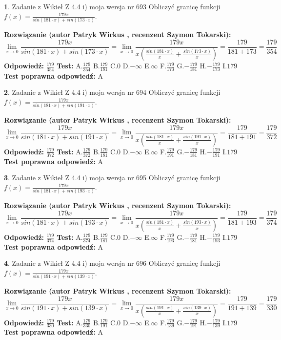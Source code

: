 \documentclass[12pt, a4paper]{article}
\theoremstyle{definition} %
\newtheorem{zad}{}
\newcommand{\zadStart}[1]{\begin{zad}#1\newline}
\newcommand{\zadStop}{\end{zad}}
\newcommand{\rozwStart}[2]{\noindent \textbf{Rozwiązanie (autor #1 , recenzent #2): }\newline}
\newcommand{\rozwStop}{\newline}
\newcommand{\odpStart}{\noindent \textbf{Odpowiedź:}\newline}
\newcommand{\odpStop}{\newline}
\newcommand{\testStart}{\noindent \textbf{Test:}\newline}
\newcommand{\testStop}{\newline}
\newcommand{\kluczStart}{\noindent \textbf{Test poprawna odpowiedź:}\newline}
\newcommand{\kluczStop}{\newline}
\begin{document}
\zadStart{Zadanie z Wikieł Z 4.4 i) moja wersja nr 693}
Obliczyć granicę funkcji $f(x)=\frac{179x}{sin(181\cdot x) +sin(173\cdot x)}$.
\zadStop
\rozwStart{Patryk Wirkus}{Szymon Tokarski}
$$\lim\limits_{x\to 0}\frac{179x}{sin(181\cdot x) +sin(173\cdot x)}=\lim\limits_{x\to 0}\frac{179x}{x(\frac{sin(181\cdot x)}{x}+\frac{sin(173\cdot x)}{x})}=\frac{179}{181+173} = \frac{179}{354}$$
\rozwStop
\odpStart
$\frac{179}{354}$
\odpStop
\testStart
A.$\frac{179}{354}$
B.$\frac{179}{181}$
C.$0$
D.$-\infty$
E.$\infty$
F.$\frac{179}{173}$
G.$-\frac{179}{181}$
H.$-\frac{179}{173}$
I.$179$
\testStop
\kluczStart
A
\kluczStop



\zadStart{Zadanie z Wikieł Z 4.4 i) moja wersja nr 694}
Obliczyć granicę funkcji $f(x)=\frac{179x}{sin(181\cdot x) +sin(191\cdot x)}$.
\zadStop
\rozwStart{Patryk Wirkus}{Szymon Tokarski}
$$\lim\limits_{x\to 0}\frac{179x}{sin(181\cdot x) +sin(191\cdot x)}=\lim\limits_{x\to 0}\frac{179x}{x(\frac{sin(181\cdot x)}{x}+\frac{sin(191\cdot x)}{x})}=\frac{179}{181+191} = \frac{179}{372}$$
\rozwStop
\odpStart
$\frac{179}{372}$
\odpStop
\testStart
A.$\frac{179}{372}$
B.$\frac{179}{181}$
C.$0$
D.$-\infty$
E.$\infty$
F.$\frac{179}{191}$
G.$-\frac{179}{181}$
H.$-\frac{179}{191}$
I.$179$
\testStop
\kluczStart
A
\kluczStop



\zadStart{Zadanie z Wikieł Z 4.4 i) moja wersja nr 695}
Obliczyć granicę funkcji $f(x)=\frac{179x}{sin(181\cdot x) +sin(193\cdot x)}$.
\zadStop
\rozwStart{Patryk Wirkus}{Szymon Tokarski}
$$\lim\limits_{x\to 0}\frac{179x}{sin(181\cdot x) +sin(193\cdot x)}=\lim\limits_{x\to 0}\frac{179x}{x(\frac{sin(181\cdot x)}{x}+\frac{sin(193\cdot x)}{x})}=\frac{179}{181+193} = \frac{179}{374}$$
\rozwStop
\odpStart
$\frac{179}{374}$
\odpStop
\testStart
A.$\frac{179}{374}$
B.$\frac{179}{181}$
C.$0$
D.$-\infty$
E.$\infty$
F.$\frac{179}{193}$
G.$-\frac{179}{181}$
H.$-\frac{179}{193}$
I.$179$
\testStop
\kluczStart
A
\kluczStop



\zadStart{Zadanie z Wikieł Z 4.4 i) moja wersja nr 696}
Obliczyć granicę funkcji $f(x)=\frac{179x}{sin(191\cdot x) +sin(139\cdot x)}$.
\zadStop
\rozwStart{Patryk Wirkus}{Szymon Tokarski}
$$\lim\limits_{x\to 0}\frac{179x}{sin(191\cdot x) +sin(139\cdot x)}=\lim\limits_{x\to 0}\frac{179x}{x(\frac{sin(191\cdot x)}{x}+\frac{sin(139\cdot x)}{x})}=\frac{179}{191+139} = \frac{179}{330}$$
\rozwStop
\odpStart
$\frac{179}{330}$
\odpStop
\testStart
A.$\frac{179}{330}$
B.$\frac{179}{191}$
C.$0$
D.$-\infty$
E.$\infty$
F.$\frac{179}{139}$
G.$-\frac{179}{191}$
H.$-\frac{179}{139}$
I.$179$
\testStop
\kluczStart
A
\kluczStop
\end{document}
